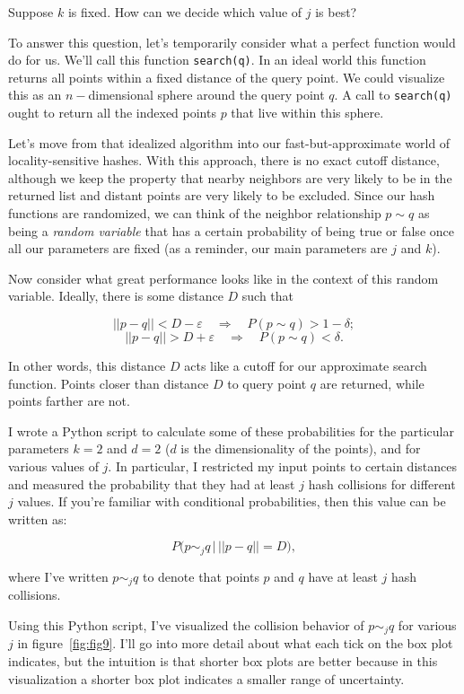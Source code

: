 \documentclass[20pt,]{extarticle}
\begin{document}
Suppose \(k\) is fixed. How can we decide which value of \(j\) is best?

To answer this question, let's temporarily consider what a perfect
function would do for us. We'll call this function \texttt{search(q)}.
In an ideal world this function returns all points within a fixed
distance of the query point. We could visualize this as an
\(n-\)dimensional sphere around the query point \(q\). A call to
\texttt{search(q)} ought to return all the indexed points \(p\) that
live within this sphere.

Let's move from that idealized algorithm into our fast-but-approximate
world of locality-sensitive hashes. With this approach, there is no
exact cutoff distance, although we keep the property that nearby
neighbors are very likely to be in the returned list and distant points
are very likely to be excluded. Since our hash functions are randomized,
we can think of the neighbor relationship \(p\sim q\) as being a
\emph{random variable} that has a certain probability of being true or
false once all our parameters are fixed (as a reminder, our main
parameters are \(j\) and \(k\)).

Now consider what great performance looks like in the context of this
random variable. Ideally, there is some distance \(D\) such that

\[||p-q|| < D-\varepsilon \quad\Rightarrow\quad P(p\sim q) > 1 - \delta;\]
\[||p-q|| > D+\varepsilon \quad\Rightarrow\quad P(p\sim q) < \delta.\]

In other words, this distance \(D\) acts like a cutoff for our
approximate search function. Points closer than distance \(D\) to query
point \(q\) are returned, while points farther are not.

I wrote a Python script to calculate some of these probabilities for the
particular parameters \(k=2\) and \(d=2\) (\(d\) is the dimensionality
of the points), and for various values of \(j\). In particular, I
restricted my input points to certain distances and measured the
probability that they had at least \(j\) hash collisions for different
\(j\) values. If you're familiar with conditional probabilities, then
this value can be written as:

\[ P\big(p \sim_j q \, \big| \, ||p-q|| = D\big), \]

where I've written \(p\sim_j q\) to denote that points \(p\) and \(q\)
have at least \(j\) hash collisions.

Using this Python script, I've visualized the collision behavior of
\(p\sim_j q\) for various \(j\) in figure~\ref{fig:fig9}. I'll go into
more detail about what each tick on the box plot indicates, but the
intuition is that shorter box plots are better because in this
visualization a shorter box plot indicates a smaller range of
uncertainty.
\end{document}
